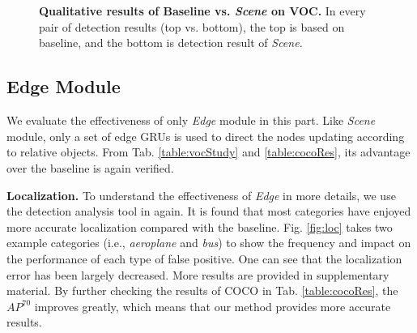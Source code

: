 \documentclass[10pt,twocolumn,letterpaper]{article}
\begin{document}
{\begin{figure}[t]
\vspace{-2ex}
\centering
{} 
 \hspace{-1ex}
  \\
 \vspace{-2ex}
 \hspace{-1ex}
   \\

\caption{{\bf Qualitative results of Baseline vs. {\em Scene} on VOC.} In every pair of detection results (top vs. bottom), the top is based on baseline, and the bottom is detection result of {\em Scene.}}
\label{fig:sceneRes}
\vspace{-2ex}
\end{figure}

\subsection{Edge Module}
We evaluate the effectiveness of only {\em Edge} module in this part. Like {\em Scene} module, only a set of edge GRUs is used to direct the nodes updating according to relative objects. From Tab. \ref{table:vocStudy} and \ref{table:cocoRes}, its advantage over the baseline is again verified.

{\bf Localization.} To understand the effectiveness of {\em Edge} in more details, we use the detection analysis tool in \cite{Error} again. 
It is found that most categories have enjoyed more accurate localization compared with the baseline. Fig. \ref{fig:loc} takes two example categories (i.e., {\em aeroplane} and {\em bus}) to show the frequency and impact on the performance of each type of false positive. One can see that the localization error has been largely decreased. More results are provided in supplementary material. By further checking the results of COCO in Tab. \ref{table:cocoRes}, the $AP^{70}$ improves greatly, which means that our method {{provides more accurate results.}}

}
\end{document}
